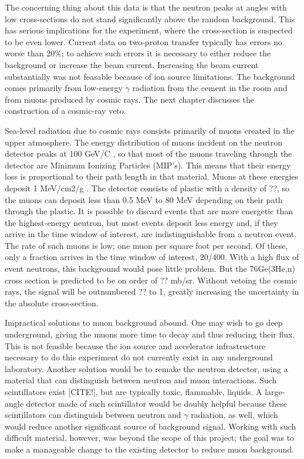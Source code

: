 

The concerning thing about this data is that the neutron peaks at angles with low cross-sections do not stand significantly above the random background.  This has serious implications for the \GeTargets experiment, where the cross-section is suspected to be even lower.  Current data on two-proton transfer typically has errors no worse than 20\%; to achieve such errors it is necessary to either reduce the background or increase the beam current.  Increasing the beam current substantially was not feasable because of ion source limitations.  The background comes primarily from low-energy $\gamma$ radiation from the cement in the room and from muons produced by cosmic rays.  The next chapter discusses the construction of a cosmic-ray veto.

Sea-level radiation due to cosmic rays consists primarily of muons created in the upper atmosphere.  The energy distribution of muons incident on the neutron detector peaks at 100 GeV/C \cite{PDG}, so that most of the muons traveling through the detector are Minimum Ionizing Particles (MIP's).  This means that their energy loss is proportional to their path length in that material.  Muons at these energies deposit 1 MeV/cm2/g \cite{PDG}.  The detector consists of plastic with a density of ??, so the muons can deposit less than 0.5 MeV to 80 MeV depending on their path through the plastic.  It is possible to discard events that are more energetic than the highest-energy neutron, but most events deposit less energy and, if they arrive in the time window of interest, are indistinguishable from a neutron event.  The rate of such muons is low; one muon per square foot per second.  Of these, only a fraction arrives in the time window of interest, 20/400.  With a high flux of event neutrons, this background would pose little problem.  But the 76Ge(3He,n) cross section is predicted to be on order of ?? mb/sr.  Without vetoing the cosmic rays, the signal will be outnumbered ?? to 1, greatly increasing the uncertainty in the absolute cross-section. 

Impractical solutions to muon background abound.  One may wish to go deep underground, giving the muons more time to decay and thus reducing their flux.  This is not feasible because the ion source and accelerator infrastructure necessary to do this experiment do not currently exist in any underground laboratory.  Another solution would be to remake the neutron detector, using a material that can distinguish between neutron and muon interactions.  Such scintillators exist [CITE!], but are typically toxic, flammable, liquids.  A large-angle detector made of such scintillator would be doubly helpful because these scintillators can distinguish between neutron and $\gamma$ radiation, as well, which would reduce another significant source of background signal.  Working with such difficult material, however, was beyond the scope of this project; the goal was to make a manageable change to the existing detector to reduce muon background. 

